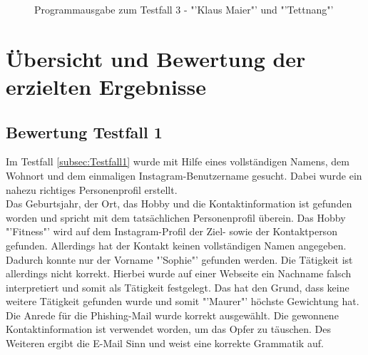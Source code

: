 			\begin{figure}[h!]
				\caption{Programmausgabe zum Testfall 3 - "'Klaus Maier"' und "'Tettnang"'}
			\end{figure}
			\FloatBarrier
			
\section{Übersicht und Bewertung der erzielten Ergebnisse}
	\subsection{Bewertung Testfall 1}
	Im Testfall \ref{subsec:Testfall1} wurde mit Hilfe eines vollständigen Namens, dem Wohnort und dem einmaligen Instagram-Benutzername gesucht. Dabei wurde ein nahezu richtiges Personenprofil erstellt.\\
	Das Geburtsjahr, der Ort, das Hobby und die Kontaktinformation ist gefunden worden und spricht mit dem tatsächlichen Personenprofil überein. Das Hobby "'Fitness"' wird auf dem Instagram-Profil der Ziel- sowie der Kontaktperson gefunden. Allerdings hat der Kontakt keinen vollständigen Namen angegeben. Dadurch konnte nur der Vorname "'Sophie"' gefunden werden. Die Tätigkeit ist allerdings nicht korrekt. Hierbei wurde auf einer Webseite ein Nachname falsch interpretiert und somit als Tätigkeit festgelegt. Das hat den Grund, dass keine weitere Tätigkeit gefunden wurde und somit "'Maurer"' höchste Gewichtung hat. \\ %
	Die Anrede für die Phishing-Mail wurde korrekt ausgewählt. Die gewonnene Kontaktinformation ist verwendet worden, um das Opfer zu täuschen. Des Weiteren ergibt die E-Mail Sinn und weist eine korrekte Grammatik auf. 
